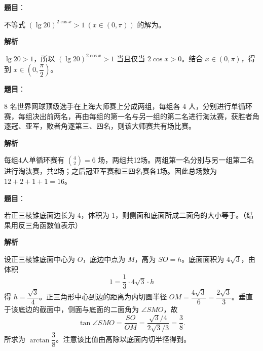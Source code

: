\begin{answer}

\textbf{题目}：

不等式 $(\lg 20)^{2\cos x}>1\ (x\in(0,\pi))$ 的解为\underline{\qquad}。

\textbf{解析}

$\lg20>1$，所以 $(\lg20)^{2\cos x}>1$ 当且仅当 $2\cos x>0$。结合 $x\in(0,\pi)$，得到 $x\in(0,\dfrac{\pi}{2})$。


\end{answer}
\begin{answer}

\textbf{题目}：

8 名世界网球顶级选手在上海大师赛上分成两组，每组各 4 人，分别进行单循环赛，每组决出前两名，再由每组的第一名与另一组的第二名进行淘汰赛，获胜者角逐冠、亚军，败者角逐第三、四名，则该大师赛共有\underline{\qquad}场比赛。

\textbf{解析}

每组4人单循环赛有 $\binom42=6$ 场，两组共12场。两组第一名分别与另一组第二名进行淘汰赛，共2场；之后冠亚军赛和三四名赛各1场。因此总场数为 $12+2+1+1=16$。


\end{answer}
\begin{answer}

\textbf{题目}：

若正三棱锥底面边长为 4，体积为 1，则侧面和底面所成二面角的大小等于\underline{\qquad}。（结果用反三角函数值表示）

\textbf{解析}

设正三棱锥底面中心为 $O$，底边中点为 $M$，高为 $SO=h$。底面面积为 $4\sqrt3$，由体积
\nopagebreak[4]
\[
1=\frac13\cdot4\sqrt3\cdot h
\]
得 $h=\dfrac{\sqrt3}{4}$。正三角形中心到边的距离为内切圆半径 $OM=\dfrac{4\sqrt3}{6}=\dfrac{2\sqrt3}{3}$。垂直于该底边的截面中，侧面与底面的二面角为 $\angle SMO$，故
\nopagebreak[4]
\[
\tan\angle SMO=\frac{SO}{OM}
=\frac{\sqrt3/4}{2\sqrt3/3}=\frac38.
\]
所求为 $\arctan\dfrac38$。注意该比值由高除以底面内切半径得到。


\end{answer}
